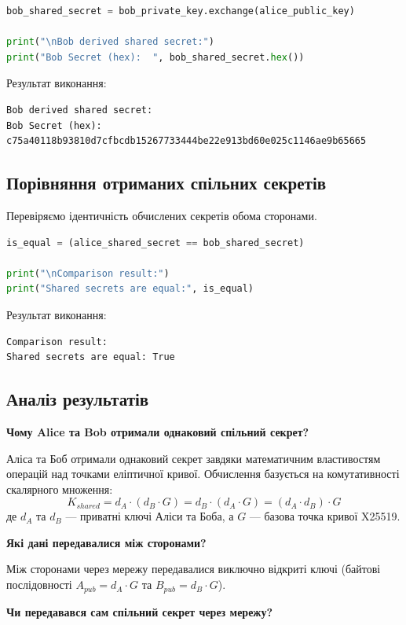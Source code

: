 \begin{lstlisting}[language=Python]
bob_shared_secret = bob_private_key.exchange(alice_public_key)

print("\nBob derived shared secret:")
print("Bob Secret (hex):  ", bob_shared_secret.hex())
\end{lstlisting}

Результат виконання:
\begin{lstlisting}
Bob derived shared secret:
Bob Secret (hex):   c75a40118b93810d7cfbcdb15267733444be22e913bd60e025c1146ae9b65665
\end{lstlisting}

\subsection{Порівняння отриманих спільних секретів}
Перевіряємо ідентичність обчислених секретів обома сторонами.

\begin{lstlisting}[language=Python]
is_equal = (alice_shared_secret == bob_shared_secret)

print("\nComparison result:")
print("Shared secrets are equal:", is_equal)
\end{lstlisting}

Результат виконання:
\begin{lstlisting}
Comparison result:
Shared secrets are equal: True
\end{lstlisting}

\subsection{Аналіз результатів}

\textbf{Чому Alice та Bob отримали однаковий спільний секрет?}

Аліса та Боб отримали однаковий секрет завдяки математичним властивостям операцій над точками
еліптичної кривої. Обчислення базується на комутативності скалярного множення:
$$K_{shared} = d_A \cdot (d_B \cdot G) = d_B \cdot (d_A \cdot G) = (d_A \cdot d_B) \cdot G$$
де $d_A$ та $d_B$ --- приватні ключі Аліси та Боба, а $G$ --- базова точка кривої X25519.

\textbf{Які дані передавалися між сторонами?}

Між сторонами через мережу передавалися виключно відкриті ключі (байтові послідовності
$A_{pub} = d_A \cdot G$ та $B_{pub} = d_B \cdot G$).

\textbf{Чи передавався сам спільний секрет через мережу?}

